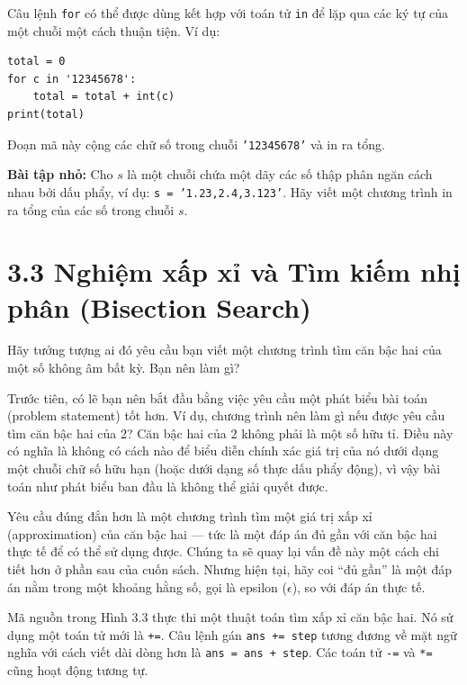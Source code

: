 Câu lệnh \texttt{for} có thể được dùng kết hợp với toán tử \texttt{in} để lặp qua các ký tự của một chuỗi một cách thuận tiện. Ví dụ:

\begin{verbatim}
total = 0
for c in '12345678':
    total = total + int(c)
print(total)
\end{verbatim}

Đoạn mã này cộng các chữ số trong chuỗi \texttt{'12345678'} và in ra tổng.

\noindent \textbf{Bài tập nhỏ:} Cho $s$ là một chuỗi chứa một dãy các số thập phân ngăn cách nhau bởi dấu phẩy, ví dụ: \texttt{s = '1.23,2.4,3.123'}. Hãy viết một chương trình in ra tổng của các số trong chuỗi $s$.

\section*{3.3 Nghiệm xấp xỉ và Tìm kiếm nhị phân (Bisection Search)}

\noindent \indent Hãy tưởng tượng ai đó yêu cầu bạn viết một chương trình tìm căn bậc hai của một số không âm bất kỳ. Bạn nên làm gì?

Trước tiên, có lẽ bạn nên bắt đầu bằng việc yêu cầu một phát biểu bài toán (problem statement) tốt hơn. Ví dụ, chương trình nên làm gì nếu được yêu cầu tìm căn bậc hai của 2? Căn bậc hai của 2 không phải là một số hữu tỉ. Điều này có nghĩa là không có cách nào để biểu diễn chính xác giá trị của nó dưới dạng một chuỗi chữ số hữu hạn (hoặc dưới dạng số thực dấu phẩy động), vì vậy bài toán như phát biểu ban đầu là không thể giải quyết được.

Yêu cầu đúng đắn hơn là một chương trình tìm một giá trị xấp xỉ (approximation) của căn bậc hai — tức là một đáp án đủ gần với căn bậc hai thực tế để có thể sử dụng được. Chúng ta sẽ quay lại vấn đề này một cách chi tiết hơn ở phần sau của cuốn sách. Nhưng hiện tại, hãy coi ``đủ gần'' là một đáp án nằm trong một khoảng hằng số, gọi là epsilon ($\epsilon$), so với đáp án thực tế.

Mã nguồn trong Hình 3.3 thực thi một thuật toán tìm xấp xỉ căn bậc hai. Nó sử dụng một toán tử mới là \texttt{+=}. Câu lệnh gán \texttt{ans += step} tương đương về mặt ngữ nghĩa với cách viết dài dòng hơn là \texttt{ans = ans + step}. Các toán tử \texttt{-=} và \texttt{*=} cũng hoạt động tương tự.

